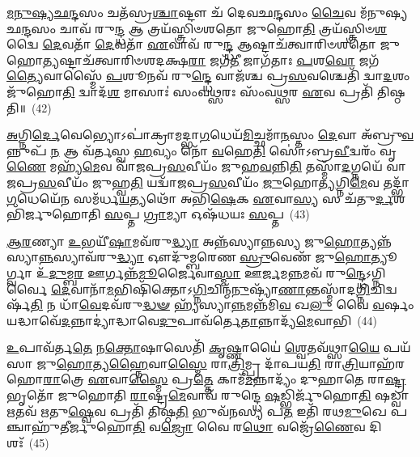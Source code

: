 \-\ul{𑌮}\-\-\ul{𑌨𑍁}\-\-\ul{𑌷𑍍𑌯}\-\-\ul{𑌛}\-\-\ul{𑌨𑍍𑌦}\-𑌸𑌂 𑌚𑌤᳴𑌸𑍍𑌰\-\ul{𑌶𑍍𑌚𑌾}\-𑌷𑍍𑌟𑍗 𑌚᳴ 𑌦𑍇𑌵𑌛\-\ul{𑌨𑍍𑌦}\-𑌸𑌂 \ul{𑌚𑍈}\-𑌵 𑌮᳴𑌨𑍁𑌷𑍍𑌯𑌛\-\ul{𑌨𑍍𑌦}\-𑌸𑌂 𑌚𑌾𑌵᳴ 𑌰𑍁\-\ul{𑌨𑍍𑌦𑍍𑌧} 𑌆 𑌤𑍍𑌰𑌯᳴𑌸𑍍𑌤𑍍𑌰𑌿𑍞𑌶𑌤𑍋 𑌜𑍁𑌹𑍋\-\ul{𑌤𑌿} 𑌤𑍍𑌰𑌯᳴𑌸𑍍𑌤𑍍𑌰𑌿𑍞\-\ul{𑌶}\-𑌦𑍍𑌵𑍈 \ul{𑌦𑍇}\-𑌵𑌤𑌾᳴ \ul{𑌦𑍇}\-𑌵𑌤𑌾᳴ \ul{𑌏}\-𑌵𑌾𑌵᳴ 𑌰𑍁\-\ul{𑌨𑍍𑌦𑍍𑌧} 𑌆𑌷𑍍𑌟𑌾𑌚᳴𑌤𑍍𑌵𑌾𑌰𑌿𑍞𑌶𑌤𑍋 𑌜𑍁𑌹𑍋\-\ul{𑌤𑍍𑌯}\-𑌷𑍍𑌟𑌾𑌚᳴𑌤𑍍𑌵𑌾𑌰𑌿𑍞𑌶𑌦𑌕𑍍𑌷\-\ul{𑌰𑌾} 𑌜𑌗᳴\-\ul{𑌤𑍀} 𑌜𑌾𑌗᳴𑌤𑌾𑌃 \ul{𑌪}\-𑌶\-\ul{𑌵𑍋} 𑌜𑌗᳴\-\ul{𑌤𑍍𑌯𑍈}\-𑌵𑌾𑌸𑍍𑌮𑍈᳴ \ul{𑌪}\-𑌶𑍂𑌨𑌵᳴ 𑌰𑍁\-\ul{𑌨𑍍𑌦𑍍𑌧𑍇} 𑌵𑌾𑌜᳴𑌶𑍍𑌚 𑌪𑍍𑌰\-\ul{𑌸}\-𑌵𑌶𑍍𑌚𑍇𑌤𑌿᳴ 𑌦𑍍𑌵𑌾\-\ul{𑌦}\-𑌶𑌂 𑌜𑍁᳴𑌹𑍋\-\ul{𑌤𑌿} 𑌦𑍍𑌵𑌾𑌦᳴\-\ul{𑌶} 𑌮𑌾𑌸𑌾𑌃॑ 𑌸𑌂𑌵\-\ul{𑌥𑍍𑌸}\-𑌰𑌃 𑌸𑌂᳴𑌵\-\ul{𑌥𑍍𑌸}\-𑌰 \ul{𑌏}\-𑌵 𑌪𑍍𑌰𑌤𑌿᳴ 𑌤𑌿𑌷𑍍𑌠𑌤𑌿॥~(42)

{\anuvakamend[{𑌵𑌿 𑌵𑍈 \ul{𑌯}\-𑌜𑍍𑌞𑌃 𑌸𑌾𑌮᳴ 𑌚 \ul{𑌮} 𑌇𑌤𑍍𑌯𑌾᳴𑌹 𑌚 \ul{𑌤𑌿}\-𑌸𑍍𑌰𑌶𑍍𑌚𑍈\-\ul{𑌕𑌾}\-𑌨𑍍𑌨𑌪᳴\-\ul{𑌞𑍍𑌚𑌾}\-𑌶𑌚𑍍𑌚᳴}]}%

\-\ul{𑌅}\-𑌗𑍍𑌨𑌿\-\ul{𑌰𑍍𑌦𑍇}\-𑌵𑍇𑌭𑍍𑌯𑍋\-𑌽𑌪𑌾॑𑌕𑍍𑌰𑌾𑌮𑌦𑍍𑌭𑌾\-\ul{𑌗}\-𑌧𑍇𑌯᳴\-\ul{𑌮𑌿}\-𑌚𑍍𑌛𑌮𑌾᳴\-\ul{𑌨}\-𑌸𑍍𑌤𑌂 \ul{𑌦𑍇}\-𑌵𑌾 𑌅᳴𑌬𑍍𑌰𑍁\-\ul{𑌵}\-𑌨𑍍𑌨𑍁𑌪᳴ \ul{𑌨} 𑌆 𑌵᳴𑌰𑍍𑌤𑌸𑍍𑌵 \ul{𑌹}\-𑌵𑍍𑌯𑌂 𑌨𑍋᳴ \ul{𑌵}\-𑌹𑍇\-\ul{𑌤𑌿} 𑌸𑍋॑\-𑌽𑌬𑍍𑌰\-\ul{𑌵𑍀}\-𑌦𑍍𑌵𑌰𑌂᳴ 𑌵𑍃\-\ul{𑌣𑍈} 𑌮𑌹𑍍𑌯᳴\-\ul{𑌮𑍇}\-𑌵 𑌵𑌾᳴𑌜𑌪𑍍𑌰\-\ul{𑌸}\-𑌵𑍀𑌯𑌂᳴ 𑌜𑍁𑌹\-\ul{𑌵}\-𑌨𑍍𑌨𑌿\-\ul{𑌤𑌿} 𑌤𑌸𑍍𑌮𑌾᳴\-\ul{𑌦}\-𑌗𑍍𑌨𑌯𑍇᳴ 𑌵𑌾𑌜𑌪𑍍𑌰\-\ul{𑌸}\-𑌵𑍀𑌯𑌂᳴ 𑌜𑍁𑌹𑍍𑌵\-\ul{𑌤𑌿} 𑌯𑌦𑍍𑌵𑌾᳴𑌜𑌪𑍍𑌰\-\ul{𑌸}\-𑌵𑍀𑌯𑌂᳴ \ul{𑌜𑍁}\-𑌹𑍋\-\ul{𑌤𑍍𑌯}\-𑌗𑍍𑌨𑌿\-\ul{𑌮𑍇}\-𑌵 𑌤𑌦𑍍𑌭𑌾᳴\-\ul{𑌗}\-𑌧𑍇𑌯𑍇᳴\-\ul{𑌨} 𑌸𑌮᳴𑌰𑍍𑌧\-\ul{𑌯}\-𑌤𑍍𑌯𑌥𑍋᳴ 𑌅𑌭𑌿\-\ul{𑌷𑍇}\-𑌕 \ul{𑌏}\-𑌵𑌾\-\ul{𑌸𑍍𑌯} 𑌸 𑌚᳴𑌤𑍁\-\ul{𑌰𑍍𑌦}\-𑌶𑌭𑌿᳴𑌰𑍍𑌜𑍁𑌹𑍋𑌤𑌿 \ul{𑌸}\-𑌪𑍍𑌤 \ul{𑌗𑍍𑌰𑌾}\-𑌮𑍍𑌯𑌾 𑌓𑌷᳴𑌧𑌯𑌃 \ul{𑌸}\-𑌪𑍍𑌤~(43)

\-\ul{𑌆}\-\-\ul{𑌰}\-𑌣𑍍𑌯𑌾 \ul{𑌉}\-𑌭𑌯𑍀᳴\-\ul{𑌷𑌾}\-𑌮𑌵᳴𑌰𑍁\-\ul{𑌦𑍍𑌧𑍍𑌯𑌾} 𑌅𑌨𑍍𑌨᳴𑌸𑍍𑌯𑌾𑌨𑍍𑌨𑌸𑍍𑌯 𑌜𑍁\-\ul{𑌹𑍋}\-𑌤𑍍𑌯𑌨𑍍𑌨᳴𑌸𑍍𑌯𑌾\-\ul{𑌨𑍍𑌨}\-𑌸𑍍𑌯𑌾𑌵᳴𑌰𑍁\-\ul{𑌦𑍍𑌧𑍍𑌯𑌾} 𑌔𑌦𑍁᳴𑌮𑍍𑌬𑌰𑍇𑌣 \ul{𑌸𑍍𑌰𑍁}\-𑌵𑍇𑌣᳴ 𑌜𑍁\-\ul{𑌹𑍋}\-𑌤𑍍𑌯𑍂𑌰𑍍𑌗𑍍𑌵𑌾 𑌉᳴\-\ul{𑌦𑍁}\-𑌮𑍍𑌬\-\ul{𑌰} 𑌊𑌰𑍍𑌗𑌨𑍍𑌨᳴\-\ul{𑌮𑍂}\-𑌰𑍍𑌜𑍈𑌵𑌾\-\ul{𑌸𑍍𑌮𑌾} 𑌊\-\ul{𑌰𑍍𑌜}\-𑌮\-\ul{𑌨𑍍𑌨}\-𑌮𑌵᳴ 𑌰𑍁\-\ul{𑌨𑍍𑌦𑍍𑌧𑍇}\-\-𑌽𑌗𑍍𑌨𑌿𑌰𑍍𑌵𑍈 \ul{𑌦𑍇}\-𑌵𑌾𑌨𑌾᳴\-\ul{𑌮}\-𑌭𑌿𑌷𑌿᳴𑌕𑍍𑌤𑍋\-𑌽\-\ul{𑌗𑍍𑌨𑌿}\-𑌚𑌿𑌨𑍍𑌮᳴\-\ul{𑌨𑍁}\-𑌷𑍍𑌯𑌾᳴\-\ul{𑌣𑌾}\-𑌨𑍍𑌤𑌸𑍍𑌮𑌾᳴𑌦\-\ul{𑌗𑍍𑌨𑌿}\-𑌚𑌿𑌦𑍍𑌵𑌰𑍍\mbox{}𑌷᳴\-\ul{𑌤𑌿} 𑌨 𑌧𑌾᳴\-\ul{𑌵𑍇}\-𑌦𑌵᳴𑌰𑍁\-\ul{𑌦𑍍𑌧}\-\-\ul{𑍟} 𑌹𑍍𑌯᳴𑌸𑍍𑌯𑌾\-\ul{𑌨𑍍𑌨}\-𑌮𑌨𑍍𑌨᳴𑌮𑌿\-\ul{𑌵} 𑌖\-\ul{𑌲𑍁} 𑌵𑍈 \ul{𑌵}\-𑌰𑍍\mbox{}𑌷𑌂 𑌯𑌦𑍍𑌧𑌾𑌵𑍇᳴\-\ul{𑌦}\-𑌨𑍍𑌨𑌾𑌦𑍍𑌯𑌾॑𑌦𑍍𑌧𑌾𑌵𑍇\-\ul{𑌦𑍁}\-𑌪𑌾𑌵᳴𑌰𑍍𑌤𑍇\-\ul{𑌤𑌾}\-𑌨𑍍𑌨𑌾𑌦𑍍𑌯᳴\-\ul{𑌮𑍇}\-𑌵𑌾𑌭𑌿~(44)

\-\ul{𑌉}\-𑌪𑌾𑌵᳴𑌰𑍍𑌤\-\ul{𑌤𑍇} 𑌨\-\ul{𑌕𑍍𑌤𑍋}\-𑌷𑌾𑌸𑍇𑌤𑌿᳴ \ul{𑌕𑍃}\-𑌷𑍍𑌣𑌾𑌯𑍈॑ \ul{𑌶𑍍𑌵𑍇}\-𑌤𑌵᳴𑌥𑍍𑌸𑌾\-\ul{𑌯𑍈} 𑌪𑌯᳴𑌸𑌾 𑌜𑍁\-\ul{𑌹𑍋}\-𑌤𑍍𑌯\-\ul{𑌹𑍍𑌨𑍈}\-𑌵𑌾\-\ul{𑌸𑍍𑌮𑍈} 𑌰𑌾\-\ul{𑌤𑍍𑌰𑌿}\-𑌮𑍍𑌪𑍍𑌰 𑌦𑌾᳴𑌪𑌯\-\ul{𑌤𑌿} 𑌰𑌾\-\ul{𑌤𑍍𑌰𑌿}\-𑌯𑌾𑌹᳴𑌰𑌹𑍋\-\ul{𑌰𑌾}\-𑌤𑍍𑌰𑍇 \ul{𑌏}\-𑌵𑌾\-\ul{𑌸𑍍𑌮𑍈} 𑌪𑍍𑌰\-\ul{𑌤𑍍𑌤𑍇} 𑌕𑌾𑌮᳴\-\ul{𑌮}\-𑌨𑍍𑌨𑌾𑌦𑍍𑌯𑌂᳴ 𑌦𑍁𑌹𑌾𑌤𑍇 𑌰𑌾\-\ul{𑌷𑍍𑌟𑍍𑌰}\-𑌭𑍃𑌤𑍋᳴ 𑌜𑍁𑌹𑍋𑌤𑌿 \ul{𑌰𑌾}\-𑌷𑍍𑌟𑍍𑌰\-\ul{𑌮𑍇}\-𑌵𑌾𑌵᳴ 𑌰𑍁𑌨𑍍𑌦𑍍𑌧𑍇 \ul{𑌷}\-𑌡𑍍𑌭𑌿𑌰𑍍𑌜𑍁᳴𑌹𑍋\-\ul{𑌤𑌿} 𑌷𑌡𑍍𑌵𑌾 \ul{𑌋}\-𑌤𑌵᳴ \ul{𑌋}\-𑌤𑍁\-\ul{𑌷𑍍𑌵𑍇}\-𑌵 𑌪𑍍𑌰𑌤𑌿᳴ 𑌤𑌿𑌷𑍍𑌠\-\ul{𑌤𑌿} 𑌭𑍁𑌵᳴𑌨𑌸𑍍𑌯 𑌪\-\ul{𑌤} 𑌇𑌤𑌿᳴ 𑌰𑌥\-\ul{𑌮𑍁}\-𑌖𑍇 𑌪𑌞𑍍𑌚𑌾𑌹𑍁᳴𑌤𑍀𑌰𑍍𑌜𑍁𑌹𑍋\-\ul{𑌤𑌿} 𑌵\-\ul{𑌜𑍍𑌰𑍋} 𑌵𑍈 𑌰\-\ul{𑌥𑍋} 𑌵𑌜𑍍𑌰𑍇᳴\-\ul{𑌣𑍈}\-𑌵 𑌦𑌿𑌶𑌃᳴~(45)

